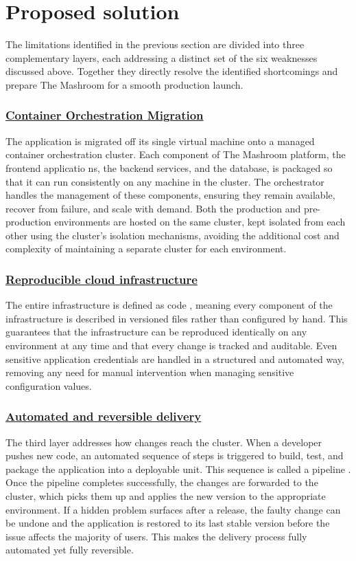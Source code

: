 \section{Proposed solution}
The limitations identified in the previous section are divided into three 
complementary layers, each addressing a distinct set of the six weaknesses 
discussed above. Together they directly resolve the identified shortcomings 
and prepare The Mashroom for a smooth production launch.

\subsubsection*{\underline{Container Orchestration Migration}}
The application is migrated off its single virtual machine onto a managed 
container orchestration cluster. Each component of The Mashroom platform, 
the frontend applicatio ns, the backend services, and the database, is 
packaged so that it can run consistently on any machine in the cluster. 
The orchestrator handles the management of these components, ensuring they 
remain available, recover from failure, and scale with demand. Both the 
production and pre-production environments are hosted on the same cluster, 
kept isolated from each other using the cluster's isolation mechanisms, 
avoiding the additional cost and complexity of maintaining a separate cluster 
for each environment.

\subsubsection*{\underline{Reproducible cloud infrastructure}}
The entire infrastructure is defined as code \cite{iac-definition}, meaning every component of the infrastructure is
described in versioned files rather than configured by hand. This guarantees 
that the infrastructure can be reproduced identically on any environment at 
any time and that every change is tracked and auditable. Even sensitive 
application credentials are handled in a structured and automated way, 
removing any need for manual intervention when managing sensitive 
configuration values.

\subsubsection*{\underline{Automated and reversible delivery}}
The third layer addresses how changes reach the cluster. When a developer 
pushes new code, an automated sequence of steps is triggered to build, test,
and package the application into a deployable unit. This sequence is called
a pipeline \cite{cicd-definition}. Once the pipeline completes successfully, the changes are forwarded 
to the cluster, which picks them up and applies the new version to the 
appropriate environment. If a hidden problem surfaces after a release, the 
faulty change can be undone and the application is restored to its last stable 
version before the issue affects the majority of users. This makes the delivery 
process fully automated yet fully reversible.

